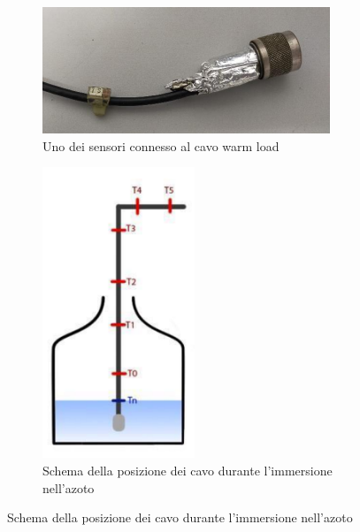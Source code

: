 \begin{figure}[h]
\centering

	\begin{subfigure}{0.49\textwidth}
		\includegraphics[width=\textwidth]{Posizione_sensori_1.png}
    		\caption{Uno dei sensori connesso al cavo warm load}
   	 	\label{fig:sub1}
	\end{subfigure}
	\hfill
	\begin{subfigure}{0.49\textwidth}
		\centering
    		\includegraphics[width=0.5\textwidth]{Posizione_sensori_3.png}
    		\caption{Schema della posizione dei cavo durante l'immersione nell'azoto}
    		\label{fig:sub2}
	\end{subfigure}


\end{figure}
